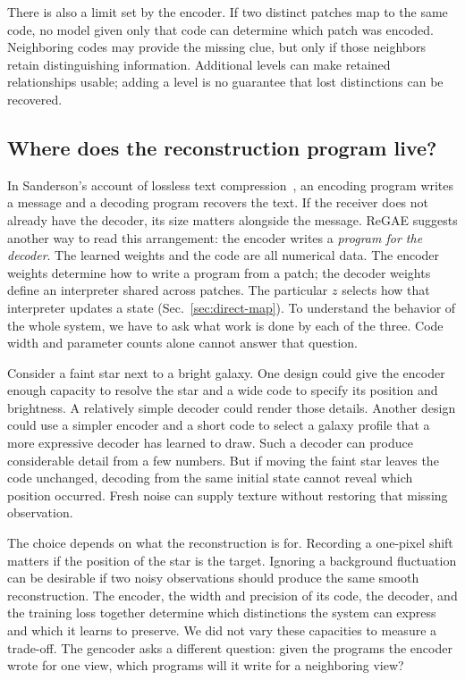 There is also a limit set by the encoder. If two distinct patches map to the same code, no model given only that code can determine which patch was encoded. Neighboring codes may provide the missing clue, but only if those neighbors retain distinguishing information. Additional levels can make retained relationships usable; adding a level is no guarantee that lost distinctions can be recovered.

\subsection{Where does the reconstruction program live?}
\label{sec:compression}

In Sanderson's account of lossless text compression~\cite{sanderson2026}, an encoding program writes a message and a decoding program recovers the text. If the receiver does not already have the decoder, its size matters alongside the message. ReGAE suggests another way to read this arrangement: the encoder writes a \emph{program for the decoder}. The learned weights and the code are all numerical data. The encoder weights determine how to write a program from a patch; the decoder weights define an interpreter shared across patches. The particular $z$ selects how that interpreter updates a state (Sec.~\ref{sec:direct-map}). To understand the behavior of the whole system, we have to ask what work is done by each of the three. Code width and parameter counts alone cannot answer that question.

Consider a faint star next to a bright galaxy. One design could give the encoder enough capacity to resolve the star and a wide code to specify its position and brightness. A relatively simple decoder could render those details. Another design could use a simpler encoder and a short code to select a galaxy profile that a more expressive decoder has learned to draw. Such a decoder can produce considerable detail from a few numbers. But if moving the faint star leaves the code unchanged, decoding from the same initial state cannot reveal which position occurred. Fresh noise can supply texture without restoring that missing observation.

The choice depends on what the reconstruction is for. Recording a one-pixel shift matters if the position of the star is the target. Ignoring a background fluctuation can be desirable if two noisy observations should produce the same smooth reconstruction. The encoder, the width and precision of its code, the decoder, and the training loss together determine which distinctions the system can express and which it learns to preserve. We did not vary these capacities to measure a trade-off. The gencoder asks a different question: given the programs the encoder wrote for one view, which programs will it write for a neighboring view?

